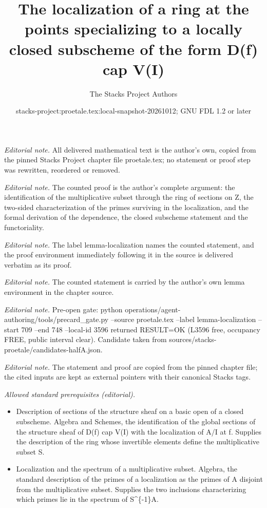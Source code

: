\documentclass[10pt,a4paper]{amsart}
\title{The localization of a ring at the points specializing to a locally closed subscheme of the form D(f) cap V(I)}
\author{The Stacks Project Authors}
\date{stacks-project:proetale.tex:local-snapshot-20261012; GNU FDL 1.2 or later}
\theoremstyle{plain}
\theoremstyle{definition}
\theoremstyle{remark}
\numberwithin{equation}{subsection}
\begin{document}
\maketitle
\noindent\textit{Editorial note.} All delivered mathematical text is the author's own, copied from the pinned Stacks Project chapter file proetale.tex; no statement or proof step was rewritten, reordered or removed.\par\medskip
\noindent\textit{Editorial note.} The counted proof is the author's complete argument: the identification of the multiplicative subset through the ring of sections on Z, the two-sided characterization of the primes surviving in the localization, and the formal derivation of the dependence, the closed subscheme statement and the functoriality.\par\medskip
\noindent\textit{Editorial note.} The label lemma-localization names the counted statement, and the proof environment immediately following it in the source is delivered verbatim as its proof.\par\medskip
\noindent\textit{Editorial note.} The counted statement is carried by the author's own lemma environment in the chapter source.\par\medskip
\noindent\textit{Editorial note.} Pre-open gate: python operations/agent-authoring/tools/precard\_gate.py --source proetale.tex --label lemma-localization --start 709 --end 748 --local-id 3596 returned RESULT=OK (L3596 free, occupancy FREE, public interval clear). Candidate taken from sources/stacks-proetale/candidates-halfA.json.\par\medskip
\noindent\textit{Editorial note.} The statement and proof are copied from the pinned chapter file; the cited inputs are kept as external pointers with their canonical Stacks tags.\par\medskip
\noindent\textit{Allowed standard prerequisites (editorial).}\begin{itemize}
\item Description of sections of the structure sheaf on a basic open of a closed subscheme. Algebra and Schemes, the identification of the global sections of the structure sheaf of D(f) cap V(I) with the localization of A/I at f. Supplies the description of the ring whose invertible elements define the multiplicative subset S.
\item Localization and the spectrum of a multiplicative subset. Algebra, the standard description of the primes of a localization as the primes of A disjoint from the multiplicative subset. Supplies the two inclusions characterizing which primes lie in the spectrum of S\textasciicircum{}\{-1\}A.
\end{itemize}\medskip
\end{document}
